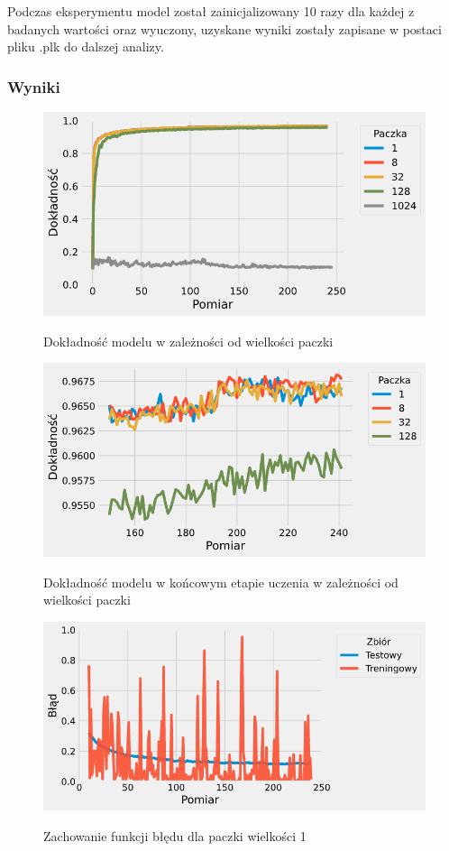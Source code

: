 \documentclass{article}
\begin{document}
Podczas eksperymentu model został zainicjalizowany 10 razy dla każdej z badanych wartości oraz wyuczony, uzyskane wyniki zostały zapisane w postaci pliku .plk do dalszej analizy.

\subsubsection*{Wyniki}
\begin{figure}[H]
	\centering
	\caption{Dokładność modelu w zależności od wielkości paczki}
	\includegraphics[width=\textwidth]{batch_acc.png}
	\label{fig:res21}
\end{figure}
\begin{figure}[H]
	\centering
	\caption{Dokładność modelu w końcowym etapie uczenia w zależności od wielkości paczki}
	\includegraphics[width=\textwidth]{batch_acc_zoom.png}
	\label{fig:res22}
\end{figure}
\begin{figure}[H]
	\centering
	\caption{Zachowanie funkcji błędu dla paczki wielkości 1}
	\includegraphics[width=\textwidth]{batch_err_1.png}
	\label{fig:res23}
\end{figure}
\end{document}
